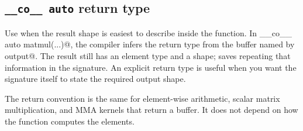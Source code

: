 \subsection*{\texttt{\_\allowbreak{}\_\allowbreak{}co\_\allowbreak{}\_\allowbreak{} auto} return type}

Use \co@auto@ when the result shape is easiest to describe inside the function. In \co@__co__ auto matmul(...)@, the compiler infers the return type from the buffer named by \co@return output@. The result still has an element type and a shape; \co@auto@ saves repeating that information in the signature. An explicit return type is useful when you want the signature itself to state the required output shape.

The return convention is the same for element-wise arithmetic, scalar matrix multiplication, and MMA kernels that return a buffer. It does not depend on how the function computes the elements.
